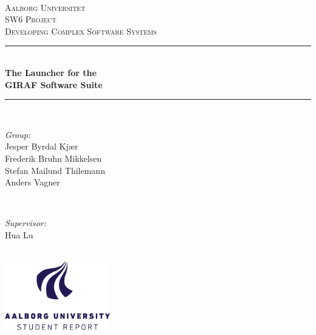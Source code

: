 %
\thispagestyle{empty}

\newcommand{\HRule}{\rule{\linewidth}{0.5mm}} %

\begin{center}
\textsc{}\\[0.5cm]

\textsc{\LARGE Aalborg Universitet}\\[0.8cm]
\textsc{\Large SW6 Project}\\[0.4cm]
\textsc{\large Developing Complex Software Systems}\\[0.6cm]

\HRule \\[0.4cm]
{ \huge \bfseries The Launcher for the}\\[0.6cm]
{ \huge \bfseries GIRAF Software Suite}\\[0cm]
\HRule \\[1.3cm]
\begin{minipage}{0.4\textwidth}
\begin{flushleft} \large
\emph{Group:}\\
Jesper Byrdal Kjær\\
Frederik Bruhn Mikkelsen\\
Stefan Mailund Thilemann\\
Anders Vagner
\end{flushleft}
\end{minipage} 
~
\begin{minipage}{0.4\textwidth}
\begin{flushright} \large
\emph{Supervisor:}\\
Hua Lu
\end{flushright}
\end{minipage}\\[1.5cm]



\vfill
\includegraphics[height=3cm]{figures/aauLogoEnStudent.png}
\vfill

\end{center}


